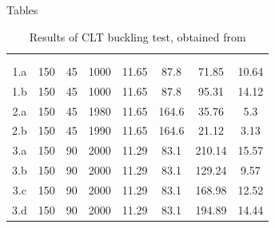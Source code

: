 \begin{frame}{Tables}
	\begin{table}
		\centering
		\caption{Results of CLT buckling test, obtained from 
		\textcite{pinaNumericalStudyElastic2019} }
		\begin{tabular}{c
						S[table-format=3.0]
						S[table-format=2.0]
						S[table-format=4.0]
						S[table-format=2.2]
						S[table-format=3.1]
						S[table-format=3.2]
						S[table-format=2.2]}
			\toprule
			{}
			& {} 
			& {}
			& {}
			& {}
			& {}
			& {}
			& {} 
			\\
			&&&&&&&\\\midrule
			1.a   & 150   & 45    & 1000  & 11.65 & 87.8  & 71.85 & 10.64 \\
			1.b   & 150   & 45    & 1000  & 11.65 & 87.8  & 95.31 & 14.12 \\
			2.a   & 150   & 45    & 1980  & 11.65 & 164.6 & 35.76 & 5.3 \\
			2.b   & 150   & 45    & 1990  & 11.65 & 164.6 & 21.12 & 3.13 \\
			3.a   & 150   & 90    & 2000  & 11.29 & 83.1  & 210.14 & 15.57 \\
			3.b   & 150   & 90    & 2000  & 11.29 & 83.1  & 129.24 & 9.57 \\
			3.c   & 150   & 90    & 2000  & 11.29 & 83.1  & 168.98 & 12.52 \\
			3.d   & 150   & 90    & 2000  & 11.29 & 83.1  & 194.89 & 14.44 
			\\\bottomrule
		\end{tabular}%
		\label{tab:CLTresults}%
	\end{table}%
\end{frame}